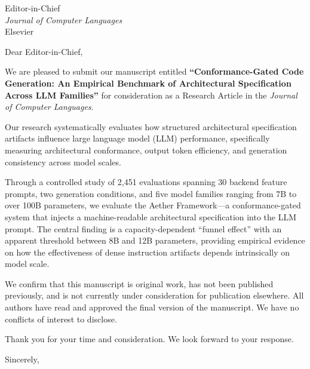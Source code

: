 \documentclass[11pt,a4paper]{letter}
\begin{document}
\begin{letter}{Editor-in-Chief \\ \textit{Journal of Computer Languages} \\ Elsevier}

\opening{Dear Editor-in-Chief,}

We are pleased to submit our manuscript entitled \textbf{``Conformance-Gated Code Generation: An Empirical Benchmark of Architectural Specification Across LLM Families''} for consideration as a Research Article in the \textit{Journal of Computer Languages}.

Our research systematically evaluates how structured architectural specification artifacts influence large language model (LLM) performance, specifically measuring architectural conformance, output token efficiency, and generation consistency across model scales.

Through a controlled study of 2,451 evaluations spanning 30 backend feature prompts, two generation conditions, and five model families ranging from 7B to over 100B parameters, we evaluate the Aether Framework---a conformance-gated system that injects a machine-readable architectural specification into the LLM prompt. The central finding is a capacity-dependent ``funnel effect'' with an apparent threshold between 8B and 12B parameters, providing empirical evidence on how the effectiveness of dense instruction artifacts depends intrinsically on model scale.

We confirm that this manuscript is original work, has not been published previously, and is not currently under consideration for publication elsewhere. All authors have read and approved the final version of the manuscript. We have no conflicts of interest to disclose.

Thank you for your time and consideration. We look forward to your response.

\closing{Sincerely,}

\end{letter}
\end{document}
